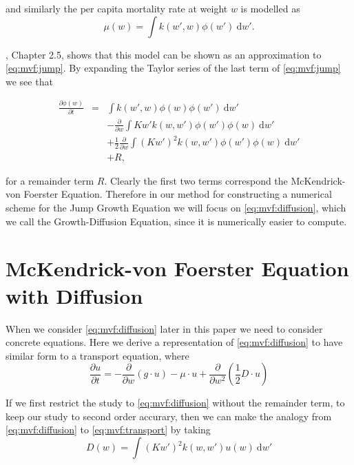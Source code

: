\documentclass[../main.tex]{subfiles}
\begin{document}
  and similarly the per capita mortality rate at weight $w$ is modelled as
  \begin{equation}\label{eq:mvf:death}
    \mu(w) = \int k(w', w) \phi(w') \: \mathrm{d}w'.
  \end{equation}

  \cite{datta2010}, Chapter 2.5, shows that this model can be shown as an approximation to \autoref{eq:mvf:jump}. By expanding the Taylor series of the last term of \autoref{eq:mvf:jump} we see that

  \begin{eqnarray}\label{eq:mvf:diffusion}
    \frac{\partial \phi(w)}{\partial t}
    &=& \int k(w', w) \phi(w)\phi(w') \: \mathrm{d}w' \nonumber \\
    && - \frac{\partial}{\partial w} \int K w' k(w, w')\phi(w')\phi(w) \: \mathrm{d}w' \nonumber \\
    && + \frac{1}{2} \frac{\partial}{\partial w} \int (K w')^2 k(w, w')\phi(w')\phi(w)  \: \mathrm{d}w' \nonumber \\
    && + R,
  \end{eqnarray}

  for a remainder term $R$. Clearly the first two terms correspond the McKendrick-von Foerster Equation. Therefore in our method for constructing a numerical scheme for the Jump Growth Equation we will focus on \autoref{eq:mvf:diffusion}, which we call the Growth-Diffusion Equation, since it is numerically easier to compute.

  \section{McKendrick-von Foerster Equation with Diffusion} \label{sec:mvf:diffusion}
  When we consider \autoref{eq:mvf:diffusion} later in this paper we need to consider concrete equations. Here we derive a representation of \autoref{eq:mvf:diffusion} to have similar form to a transport equation, where
  \begin{equation}\label{eq:mvf:transport}
    \frac{\partial u}{\partial t} = - \frac{\partial}{\partial w} ( g \cdot u ) - \mu \cdot u + \frac{\partial}{\partial w^2} \left( \frac{1}{2} D \cdot u \right)
  \end{equation}

  If we first restrict the study to \autoref{eq:mvf:diffusion} without the remainder term, to keep our study to second order accurary, then we can make the analogy from \autoref{eq:mvf:diffusion} to \autoref{eq:mvf:transport} by taking
  \begin{equation}
    D(w) =\int (K w')^2 k(w, w') u(w) \: \mathrm{d} w'
  \end{equation}
\end{document}
